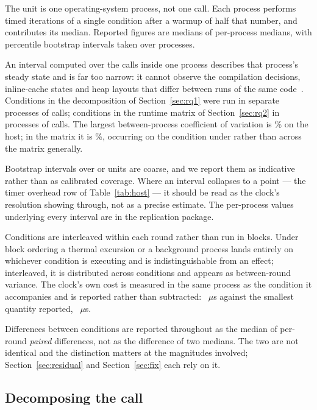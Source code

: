 \documentclass[pdflatex,sn-basic,twocolumn]{sn-jnl}%
\begin{document}
The unit is one operating-system process, not one call. Each process performs
\HostCallsPerInvocation{} timed iterations of a single condition after a warmup
of half that number, and contributes its median. Reported figures are medians of
per-process medians, with percentile bootstrap intervals taken over processes.

An interval computed over the calls inside one process describes that process's
steady state and is far too narrow: it cannot observe the compilation decisions,
inline-cache states and heap layouts that differ between runs of the same
code~\citep{georges2007statistically}. Conditions in the decomposition of
Section~\ref{sec:rq1} were run in \HostInvocations{} separate processes of
\HostCallsPerInvocation{} calls; conditions in the runtime matrix of
Section~\ref{sec:rq2} in \MatrixInvocations{} processes of
\MatrixCallsPerInvocation{} calls. The largest between-process coefficient of
variation is \HostCvMax\% on the host; in the matrix it is \MatrixCvMax\%,
occurring on the \MatrixCvMaxCondition{} condition under
\MatrixCvMaxEnvironment{} rather than across the matrix generally.

Bootstrap intervals over \HostInvocations{} or \MatrixInvocations{} units are
coarse, and we report them as indicative rather than as calibrated coverage.
Where an interval collapses to a point --- the timer overhead row of
Table~\ref{tab:host} --- it should be read as the clock's resolution showing
through, not as a precise estimate. The per-process values underlying every
interval are in the replication package.

Conditions are interleaved within each round rather than run in blocks. Under
block ordering a thermal excursion or a background process lands entirely on
whichever condition is executing and is indistinguishable from an effect;
interleaved, it is distributed across conditions and appears as between-round
variance. The clock's own cost is measured in the same process as the condition
it accompanies and is reported rather than subtracted: \HostTimerOverhead~$\mu$s
against the smallest quantity reported, \HostCreateSecretKey~$\mu$s.

Differences between conditions are reported throughout as the median of
per-round \emph{paired} differences, not as the difference of two medians. The
two are not identical and the distinction matters at the magnitudes involved;
Section~\ref{sec:residual} and Section~\ref{sec:fix} each rely on it.

\subsection{Decomposing the call}\label{sec:decompose}
\end{document}
